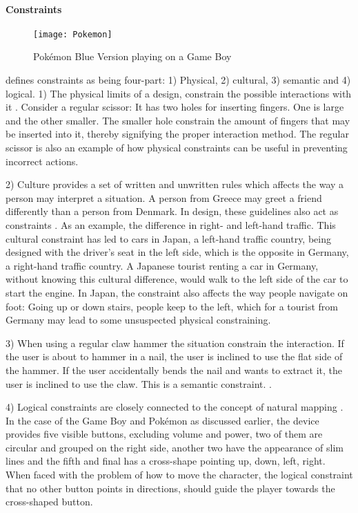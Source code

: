 \paragraph{Constraints}
\begin{wrapfigure}{i}{0.35\textwidth}
  \texttt{[image: Pokemon]}
  \caption{Pokémon Blue Version playing on a Game Boy}
  \label{pokemon}
\end{wrapfigure}
 defines constraints as being four-part: 1) Physical, 2) cultural, 3) semantic and 4) logical. 1) The physical limits of a design, constrain the possible interactions with it \cite{norman}. Consider a regular scissor: It has two holes for inserting fingers. One is large and the other smaller. The smaller hole constrain the amount of fingers that may be inserted into it, thereby signifying the proper interaction method. The regular scissor is also an example of how physical constraints can be useful in preventing incorrect actions.

2) Culture provides a set of written and unwritten rules which affects the way a person may interpret a situation. A person from Greece may greet a friend differently than a person from Denmark. In design, these guidelines also act as constraints \cite{norman}. As an example, the difference in right- and left-hand traffic. This cultural constraint has led to cars in Japan, a left-hand traffic country, being designed with the driver's seat in the left side, which is the opposite in Germany, a right-hand traffic country. A Japanese tourist renting a car in Germany, without knowing this cultural difference, would walk to the left side of the car to start the engine. In Japan, the constraint also affects the way people navigate on foot: Going up or down stairs, people keep to the left, which for a tourist from Germany may lead to some unsuspected physical constraining.

3) When using a regular claw hammer the situation constrain the interaction. If the user is about to hammer in a nail, the user is inclined to use the flat side of the hammer. If the user accidentally bends the nail and wants to extract it, the user is inclined to use the claw. This is a semantic constraint. \cite{norman}.

4) Logical constraints are closely connected to the concept of natural mapping \cite{norman}. In the case of the Game Boy and Pokémon as discussed earlier, the device provides five visible buttons, excluding volume and power, two of them are circular and grouped on the right side, another two have the appearance of slim lines and the fifth and final has a cross-shape pointing up, down, left, right. When faced with the problem of how to move the character, the logical constraint that no other button points in directions, should guide the player towards the cross-shaped button.
